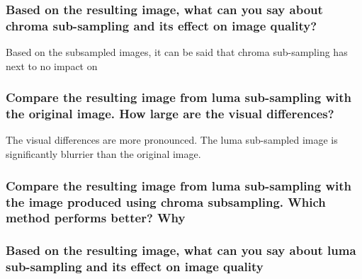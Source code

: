 \subsubsection{Based on the resulting image, what can you say about chroma sub-sampling and its effect on image
quality?}
Based on the subsampled images, it can be said that chroma sub-sampling has next to no impact on 


\subsubsection{Compare the resulting image from luma sub-sampling with the original image. How large are the
visual differences?}
The visual differences are more pronounced. The luma sub-sampled image is significantly blurrier than the original image.


\subsubsection{ Compare the resulting image from luma sub-sampling with the image produced using chroma subsampling. Which method performs better? Why}

\subsubsection{Based on the resulting image, what can you say about luma sub-sampling and its effect on image
quality}